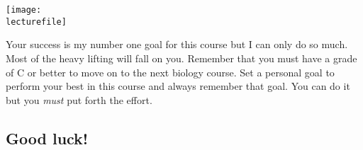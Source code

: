 \documentclass[letterpaper]{tufte-handout}
\newcommand\lecturefile{163_lecture00}
\begin{document}
\begin{marginfigure}[1in]
	\texttt{[image: \\lecturefile]}
\end{marginfigure}

Your success is my number one goal for this course but I can only do so much. Most of the heavy lifting will fall on you. Remember that you must have a grade of C or better to move on to the next biology course. Set a personal goal to perform your best in this course and always remember that goal. You can do it but you \emph{must} put forth the effort.

\subsection{Good luck!}
\end{document}
